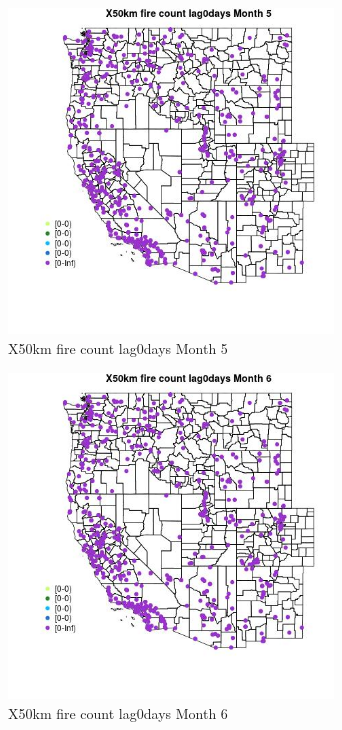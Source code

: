 \begin{figure} 
\centering  
\includegraphics[width=0.77\textwidth]{Code_Outputs/Report_ML_input_PM25_Step4_part_e_de_duplicated_aves_compiled_2019-05-14wNAs_MapObsMo5X50km_fire_count_lag0days.jpg} 
\caption{\label{fig:Report_ML_input_PM25_Step4_part_e_de_duplicated_aves_compiled_2019-05-14wNAsMapObsMo5X50km_fire_count_lag0days}X50km fire count lag0days Month 5} 
\end{figure} 
 

\begin{figure} 
\centering  
\includegraphics[width=0.77\textwidth]{Code_Outputs/Report_ML_input_PM25_Step4_part_e_de_duplicated_aves_compiled_2019-05-14wNAs_MapObsMo6X50km_fire_count_lag0days.jpg} 
\caption{\label{fig:Report_ML_input_PM25_Step4_part_e_de_duplicated_aves_compiled_2019-05-14wNAsMapObsMo6X50km_fire_count_lag0days}X50km fire count lag0days Month 6} 
\end{figure} 
 

